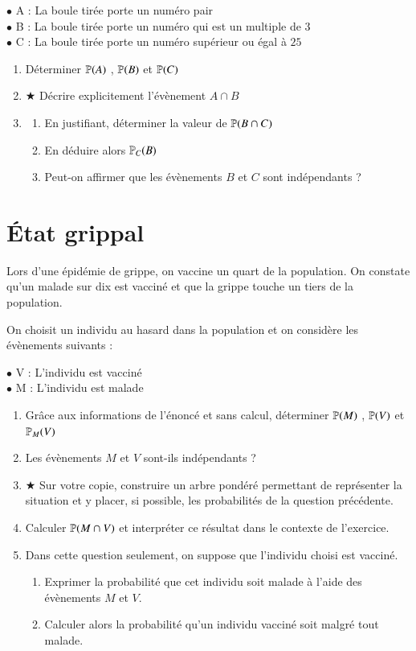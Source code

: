 \documentclass[oneside,12pt]{exam}          %
\begin{document}
$\bullet$ A : \og La boule tirée porte un numéro pair \fg \\
$\bullet$ B : \og La boule tirée porte un numéro qui est un multiple de 3\fg \\
$\bullet$ C : \og La boule tirée porte un numéro supérieur ou égal à $25$ \fg
\begin{enumerate}[itemsep = 0pt]
	\item Déterminer ${\mathbb P}(A)$ , ${\mathbb P}(B)$ et ${\mathbb P}(C)$
	\item $\bigstar$ Décrire explicitement l'évènement $A \cap B$
	\item \begin{enumerate}
		\item En justifiant, déterminer la valeur de ${\mathbb P}(B \cap C)$
		\item En déduire alors ${\mathbb P}_C(B)$
		\item Peut-on affirmer que les évènements $B$ et $C$ sont indépendants ?
	\end{enumerate}
\end{enumerate}



\section{État grippal}
Lors d'une épidémie de grippe, on vaccine un quart de la population. On constate qu'un malade sur dix est vacciné et que la grippe touche un tiers de la population.

On choisit un individu au hasard dans la population et on considère les évènements suivants :

$\bullet$ V : \og L'individu est vacciné \fg \\
$\bullet$ M : \og L'individu est malade \fg 
\begin{enumerate}[align = left]
	\item Grâce aux informations de l'énoncé et sans calcul, déterminer ${\mathbb P}(M)$ , ${\mathbb P}(V)$ et ${\mathbb P}_M(V)$
	\item Les évènements $M$ et $V$ sont-ils indépendants ?
	\item $\bigstar$ Sur votre copie, construire un arbre pondéré permettant de représenter la situation et y placer, si possible, les probabilités de la question précédente.
	\item Calculer ${\mathbb P}(M \cap V)$ et interpréter ce résultat dans le contexte de l'exercice.
	\item Dans cette question seulement, on suppose que l'individu choisi est vacciné.
	\begin{enumerate}
		\item Exprimer la probabilité que cet individu soit malade à l'aide des évènements $M$ et $V$.
		\item Calculer alors la probabilité qu'un individu vacciné soit malgré tout malade.
	\end{enumerate}
\end{enumerate}
\end{document}
